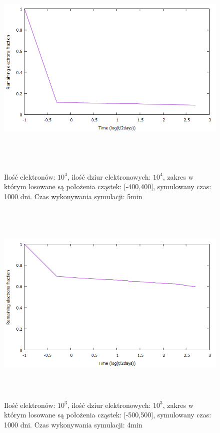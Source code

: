 \begin{figure}[H]
\centering
\includegraphics[width=17cm, height = 10cm]{wykres2_2}
\label{rys:2}
\caption{Ilość elektronów: $10^{4}$, ilość dziur elektronowych: $10^{4}$, zakres w którym losowane są położenia cząstek: [-400,400], symulowany czas: 1000 dni. Czas wykonywania symulacji: 5min}
\end{figure}




\begin{figure}[H]
\centering
\includegraphics[width=17cm, height = 10cm]{wykres3}
\caption{Ilość elektronów: $10^{3}$, ilość dziur elektronowych: $10^{3}$, zakres w którym losowane są położenia cząstek: [-500,500], symulowany czas: 1000 dni. Czas wykonywania symulacji: 4min}
\end{figure}




